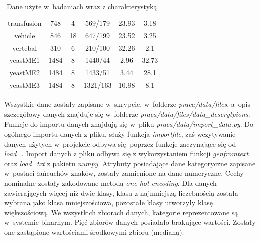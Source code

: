 \begin{table}[H]
\begin{center}
{\begin{tabular}{|c|c|c|c|c|c|}
				transfusion&748&4&569/179&23.93&3.18\\%
				vehicle&846&18&647/199&23.52&3.25\\%
				vertebal&310&6&210/100&32.26&2.1\\%
				yeastME1&1484&8&1440/44&2.96&32.73\\%
				yeastME2&1484&8&1433/51&3.44&28.1\\%
				yeastME3&1484&8&1321/163&10.98&8.1\\%
				\hline%
			\end{tabular}}
			\caption{Dane użyte w~badaniach wraz z charakterystyką.}
			\label{danebadania}
		\end{center}
	\end{table}
Wszystkie dane zostały zapisane w~skrypcie, w~folderze \textit{praca/data/files}, a~opis szczegółowy danych znajduje się w~folderze \textit{praca/data/files/data\_descrytpions}. Funkcje do importu danych znajdują się w~pliku \textit{praca/data/import\_data.py}. Do ogólnego importu danych z pliku, służy funkcja \textit{importfile}, zaś wczytywanie danych użytych w~projekcie odbywa się poprzez funkcje zaczynające się od \textit{load\_}. Import danych z pliku odbywa się z wykorzystaniem funkcji \textit{genfromtext} oraz \textit{load\_txt} z pakietu \textit{numpy}. Atrybuty posiadające dane kategoryczne zapisane w~postaci łańcuchów znaków, zostały zamienione na dane numeryczne. Cechy nominalne zostały zakodowane metodą \textit{one hot encoding}. Dla danych zawierających więcej niż dwie klasy, klasa z najmniejszą liczebnością została wybrana jako klasa mniejszościowa, pozostałe klasy utworzyły klasę większościową. We wszystkich zbiorach danych, kategorie reprezentowane są w~systemie binarnym. Pięć zbiorów danych posiadało brakujące wartości. Zostały one zastąpione wartościami środkowymi zbioru (medianą).

